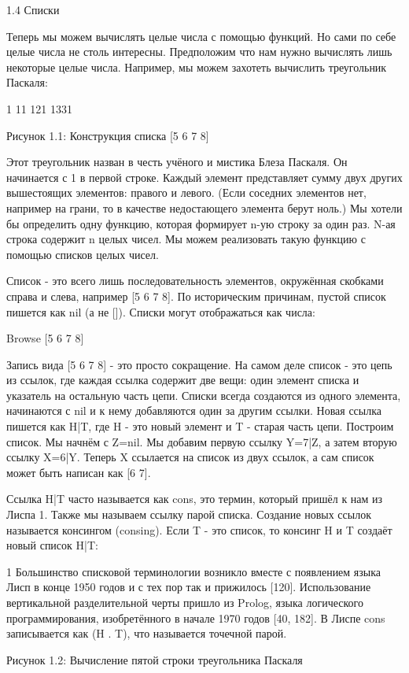 1.4 Списки

Теперь мы можем вычислять целые числа с помощью функций. Но сами по себе целые числа не столь интересны. Предположим что нам нужно вычислять лишь некоторые целые числа. Например, мы можем захотеть вычислить треугольник Паскаля:

1
11
121
1331

Рисунок 1.1: Конструкция списка [5 6 7 8]

Этот треугольник назван в честь учёного и мистика Блеза Паскаля. Он начинается с 1 в первой строке. Каждый элемент представляет сумму двух других вышестоящих элементов: правого и левого. (Если соседних элементов нет, например на грани, то в качестве недостающего элемента берут ноль.) Мы хотели бы определить одну функцию, которая формирует n-ую строку за один раз. N-ая строка содержит n целых чисел. Мы можем реализовать такую функцию с помощью списков целых чисел.

Список - это всего лишь последовательность элементов, окружённая скобками справа и слева, например [5 6 7 8]. По историческим причинам, пустой список пишется как nil (а не []). Списки могут отображаться как числа:

{Browse [5 6 7 8]}

Запись вида [5 6 7 8] - это просто сокращение. На самом деле список - это цепь из ссылок, где каждая ссылка содержит две вещи: один элемент списка и указатель на остальную часть цепи. Списки всегда создаются из одного элемента, начинаются с nil и к нему добавляются один за другим ссылки. Новая ссылка пишется как H|T, где H - это новый элемент и T - старая часть цепи. Построим список. Мы начнём с Z=nil. Мы добавим первую ссылку Y=7|Z, а затем вторую ссылку X=6|Y. Теперь X ссылается на список из двух ссылок, а сам список может быть написан как [6 7].

Ссылка H|T часто называется как cons, это термин, который пришёл к нам из Лиспа 1. Также мы называем ссылку парой списка. Создание новых ссылок называется консингом (consing). Если T - это список, то консинг H и T создаёт новый список H|T:

1 Большинство списковой терминологии возникло вместе с появлением языка Лисп в конце 1950 годов и с тех пор так и прижилось [120]. Использование вертикальной разделительной черты пришло из Prolog, языка логического программирования, изобретённого в начале 1970 годов [40, 182]. В Лиспе cons записывается как (H . T), что называется точечной парой.

Рисунок 1.2: Вычисление пятой строки треугольника Паскаля

